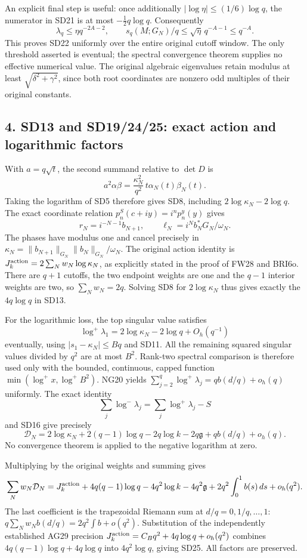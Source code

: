 \documentclass[11pt]{article}
\begin{document}
An explicit final step is useful: once additionally \(|\log\eta|\le(1/6)\log q\), the numerator in SD21 is at most \(-\tfrac12q\log q\). Consequently \[
\lambda_q\le\eta q^{-2A-2},\qquad
s_q(M;G_N)/q\le\sqrt\eta\,q^{-A-1}\le q^{-A}.
\] This proves SD22 uniformly over the entire original cutoff window. The only threshold asserted is eventual; the spectral convergence theorem supplies no effective numerical value. The original algebraic eigenvalues retain modulus at least \(\sqrt{\delta^2+\gamma^2}\), since both root coordinates are nonzero odd multiples of their original constants.

\subsection{4. SD13 and SD19/24/25: exact action and logarithmic factors}\label{osdind:sd13-and-sd192425-exact-action-and-logarithmic-factors}

With \(a=q\sqrt t\), the second summand relative to \(\det D\) is \[
a^2\alpha\beta
=\frac{\kappa_N^2}{q^2}\,t\alpha_N(t)\beta_N(t).
\] Taking the logarithm of SD5 therefore gives SD8, including \(2\log\kappa_N-2\log q\). The exact coordinate relation \(p_n^S(c+iy)=i^np_n^y(y)\) gives \[
r_N=i^{-N-1}b_{N+1},\qquad
\ell_N=i^N b_N^*G_N/\omega_N.
\] The phases have modulus one and cancel precisely in \(\kappa_N=\|b_{N+1}\|_{G_N}\|b_N\|_{G_N}/\omega_N\). The original action identity is \(J_k^{\rm action}=2\sum_Nw_N\log\kappa_N\), as explicitly stated in the proof of FW28 and BRI6o. There are \(q+1\) cutoffs, the two endpoint weights are one and the \(q-1\) interior weights are two, so \(\sum_Nw_N=2q\). Solving SD8 for \(2\log\kappa_N\) thus gives exactly the \(4q\log q\) in SD13.

For the logarithmic loss, the top singular value satisfies \[
\log^+\lambda_1=2\log\kappa_N-2\log q+O_h(q^{-1})
\] eventually, using \(|s_1-\kappa_N|\le Bq\) and SD11. All the remaining squared singular values divided by \(q^2\) are at most \(B^2\). Rank-two spectral comparison is therefore used only with the bounded, continuous, capped function \(\min(\log^+x,\log^+B^2)\). NG20 yields \(\sum_{j=2}^q\log^+\lambda_j=qb(d/q)+o_h(q)\) uniformly. The exact identity \[
\sum_j\log^-\lambda_j=\sum_j\log^+\lambda_j-S
\] and SD16 give precisely \[
\mathcal D_N=2\log\kappa_N+2(q-1)\log q
-2q\log k-2q\mathfrak g+qb(d/q)+o_h(q).
\] No convergence theorem is applied to the negative logarithm at zero.

Multiplying by the original weights and summing gives \[
\sum_Nw_N\mathcal D_N=J_k^{\rm action}
+4q(q-1)\log q-4q^2\log k-4q^2\mathfrak g
+2q^2\int_0^1b(s)\,ds+o_h(q^2).
\] The last coefficient is the trapezoidal Riemann sum at \(d/q=0,1/q,\ldots,1\): \(q\sum_Nw_Nb(d/q)=2q^2\int b+o(q^2)\). Substitution of the independently established AG29 precision \(J_k^{\rm action}=C_Bq^2+4q\log q+o_h(q^2)\) combines \(4q(q-1)\log q+4q\log q\) into \(4q^2\log q\), giving SD25. All factors are preserved.
\end{document}
